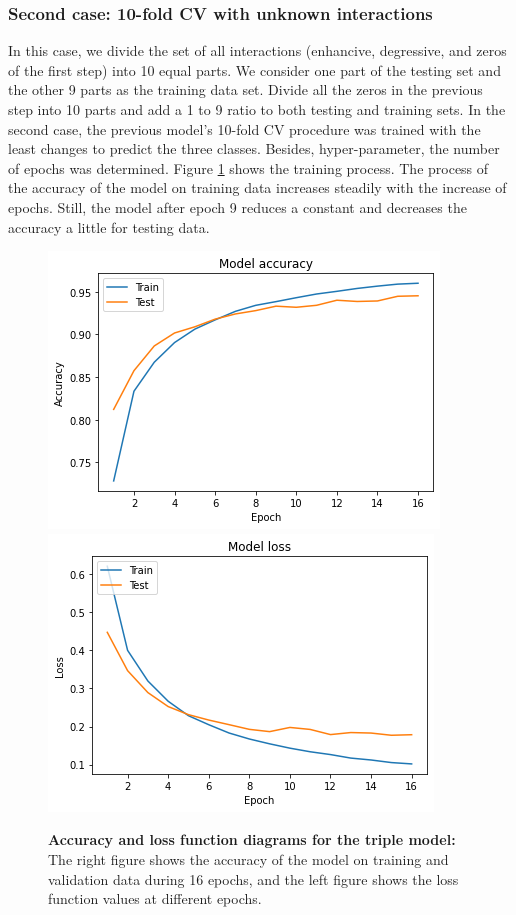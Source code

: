 \documentclass{bmcart}
\begin{document}
\subsubsection*{Second case: 10-fold CV with unknown interactions}
In this case, we divide the set of all interactions (enhancive, degressive, and zeros of the first step) into 10 equal parts. We consider one part of the testing set and the other 9 parts as the training data set. Divide all the zeros in the previous step into 10 parts and add a 1 to 9 ratio to both testing and training sets. In the second case, the previous model's 10-fold CV procedure was trained with the least changes to predict the three classes. Besides, hyper-parameter, the number of epochs was determined. Figure \ref{lastTripleModel} shows the training process. The process of the accuracy of the model on training data increases steadily with the increase of epochs. Still, the model after epoch 9 reduces a constant and decreases the accuracy a little for testing data.

\begin{figure}[!h]
	\begin{minipage}{1\linewidth}
		\includegraphics[width=.48\textwidth]{lastTripleModel/modelTripleACC.png}
		\includegraphics[width=.48\textwidth]{lastTripleModel/modelTripleLoss.png}
	\end{minipage}
	\caption{\textbf{Accuracy and loss function diagrams for the triple model:} The right figure shows the accuracy of the model on training and validation data during 16 epochs, and the left figure shows the loss function values at different epochs.}
	\label{lastTripleModel}
\end{figure}
\end{document}
